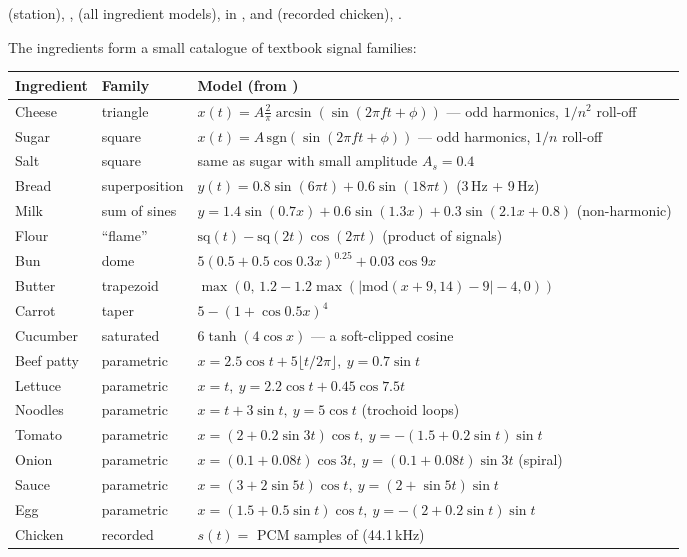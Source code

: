 \documentclass[11pt,a4paper]{article}
\begin{document}
\begin{filesbox}
 (station), ,
 (all ingredient models), 
in ,  and
 (recorded chicken), .
\end{filesbox}

The ingredients form a small catalogue of textbook signal families:
\begin{longtable}{@{}P{2.3cm}P{2.4cm}P{11.1cm}@{}}
\toprule
Ingredient & Family & Model (from ) \\
\midrule
\endhead
Cheese & triangle & $x(t)=A\tfrac{2}{\pi}\arcsin(\sin(2\pi ft+\phi))$ --- odd harmonics, $1/n^2$ roll-off \\
Sugar & square & $x(t)=A\,\mathrm{sgn}(\sin(2\pi ft+\phi))$ --- odd harmonics, $1/n$ roll-off \\
Salt & square & same as sugar with small amplitude $A_s=0.4$ \\
Bread & superposition & $y(t)=0.8\sin(6\pi t)+0.6\sin(18\pi t)$ (3\,Hz + 9\,Hz) \\
Milk & sum of sines & $y=1.4\sin(0.7x)+0.6\sin(1.3x)+0.3\sin(2.1x+0.8)$ (non-harmonic) \\
Flour & ``flame'' & $\mathrm{sq}(t)-\mathrm{sq}(2t)\cos(2\pi t)$ (product of signals) \\
Bun & dome & $5(0.5+0.5\cos 0.3x)^{0.25}+0.03\cos 9x$ \\
Butter & trapezoid & $\max(0,\,1.2-1.2\max(|\mathrm{mod}(x+9,14)-9|-4,0))$ \\
Carrot & taper & $5-(1+\cos 0.5x)^4$ \\
Cucumber & saturated & $6\tanh(4\cos x)$ --- a soft-clipped cosine \\
Beef patty & parametric & $x=2.5\cos t+5\lfloor t/2\pi\rfloor,\ y=0.7\sin t$ \\
Lettuce & parametric & $x=t,\ y=2.2\cos t+0.45\cos 7.5t$ \\
Noodles & parametric & $x=t+3\sin t,\ y=5\cos t$ (trochoid loops) \\
Tomato & parametric & $x=(2+0.2\sin3t)\cos t,\ y=-(1.5+0.2\sin t)\sin t$ \\
Onion & parametric & $x=(0.1+0.08t)\cos3t,\ y=(0.1+0.08t)\sin 3t$ (spiral) \\
Sauce & parametric & $x=(3+2\sin5t)\cos t,\ y=(2+\sin5t)\sin t$ \\
Egg & parametric & $x=(1.5+0.5\sin t)\cos t,\ y=-(2+0.2\sin t)\sin t$ \\
Chicken & recorded & $s(t)=$ PCM samples of  (44.1\,kHz) \\
\bottomrule
\end{longtable}
\end{document}
